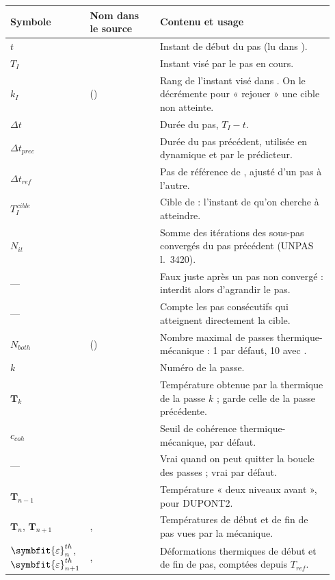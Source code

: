 \documentclass[11pt,a4paper]{article}
\makeatletter
\numberwithin{equation}{section}
\newcommand{\src}[1]{\texttt{\detokenize{#1}}}          %
\newcommand{\pr}[1]{\textsf{#1}}                        %
\newcommand{\lig}[1]{l.~#1}
\newcommand{\vc}[1]{\symbf{#1}}                         %
\newcommand{\eps}{\varepsilon}
\newcommand{\vg}[1]{\symbfit{#1}}                       %
\newenvironment{glossaire}[1][Glossaire]{%
  \par\smallskip\needspace{7\baselineskip}\noindent{\sffamily\bfseries\small #1}\par\nopagebreak
  \small
  \renewcommand{\arraystretch}{1.18}
  \begin{longtable}{@{}>{\raggedright\arraybackslash}p{0.17\linewidth}
                     >{\raggedright\arraybackslash}p{0.22\linewidth}
                     >{\raggedright\arraybackslash}p{0.555\linewidth}@{}}
  \toprule
  \textbf{Symbole} & \textbf{Nom dans le source} & \textbf{Contenu et usage}\\
  \midrule\endhead
  \bottomrule\endfoot}
  {\end{longtable}\addtocounter{table}{-1}\normalsize\vspace{-0.4em}}
\makeatother
\begin{document}
\begin{glossaire}
$t$ & \src{TEMP0} & Instant de début du pas (lu dans \src{conti.'TEMPS'}).\\
$T_I$ & \src{TI} & Instant visé par le pas en cours.\\
$k_I$ & \src{ICHG} (\src{WTAB.'ICHG'}) & Rang de l'instant visé dans \src{TEMPS_CALCULES}. On le décrémente pour « rejouer » une cible non atteinte.\\
$\Delta t$ & \src{WTAB.'DT'} & Durée du pas, $T_I - t$.\\
$\Delta t_{prec}$ & \src{WTAB.'DTPREC'} & Durée du pas précédent, utilisée en dynamique et par le prédicteur.\\
$\Delta t_{ref}$ & \src{DT_AVANT} & Pas de référence de \src{PAS_AJUSTE}, ajusté d'un pas à l'autre.\\
$T_I^{\,cible}$ & \src{TIV} & Cible de \src{PAS_AJUSTE} : l'instant de \src{TEMPS_CALCULES} qu'on cherche à atteindre.\\
$N_{it}$ & \src{NOMBRE_ITERATIONS} & Somme des itérations des sous-pas convergés du pas précédent (\pr{UNPAS} \lig{3420}).\\
— & \src{IREREDU} & Faux juste après un pas non convergé : interdit alors d'agrandir le pas.\\
— & \src{PASFINAL} & Compte les pas consécutifs qui atteignent directement la cible.\\
$N_{both}$ & \src{BOU_METH} (\src{NB_BOTH}) & Nombre maximal de passes thermique-mécanique : 1 par défaut, 10 avec \src{CONVERGENCE_MEC_THE}.\\
$k$ & \src{I_BOTH} & Numéro de la passe.\\
$\vc T_k$ & \src{THER_COURANT} & Température obtenue par la thermique de la passe $k$ ; \src{THER_COURANTP} garde celle de la passe précédente.\\
$c_{coh}$ & \src{CRITERE_COHERENCE} & Seuil de cohérence thermique-mécanique, \src{PRECISION} par défaut.\\
— & \src{CONV_THMEC} & Vrai quand on peut quitter la boucle des passes ; vrai par défaut.\\
$\vc T_{n-1}$ & \src{TET0} & Température « deux niveaux avant », pour \pr{DUPONT2}.\\
$\vc T_n$, $\vc T_{n+1}$ & \src{TET1}, \src{TET2} & Températures de début et de fin de pas vues par la mécanique.\\
$\vg\eps^{th}_n$, $\vg\eps^{th}_{n+1}$ & \src{ETHER1}, \src{ETHER2} & Déformations thermiques de début et de fin de pas, comptées depuis $T_{ref}$.\\

\end{glossaire}
\end{document}

